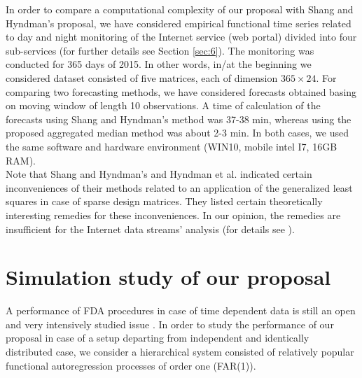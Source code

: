 \documentclass[12pt,a4paper]{article}
\numberwithin{equation}{section}
\begin{document}
In order to compare a computational complexity of our proposal with Shang and Hyndman's proposal, we have considered empirical functional time series related to day and night monitoring of the Internet service (web portal) divided into four sub-services (for further details see Section \ref{sec:6}). The monitoring was conducted for 365 days of 2015. In other words, in/at the beginning we considered dataset consisted of five matrices, each of dimension $365\times 24$. For comparing two forecasting methods, we have considered forecasts obtained basing on moving window of length 10 observations.
A time of calculation of the forecasts using Shang and Hyndman's method was 37-38 min, whereas using the proposed aggregated median method was about 2-3 min. In both cases, we used the same software and hardware environment (WIN10,
mobile intel I7, 16GB RAM).%
\\ Note that Shang and Hyndman's \cite{Shang} and Hyndman et al. \cite{Hyndman2011} indicated certain inconveniences of their methods related to an application of the generalized least squares in case of sparse design matrices. They listed certain theoretically interesting remedies for these inconveniences. In our opinion, the remedies are insufficient for the Internet data streams' analysis (for details see \cite{Kos2016}).
\section{Simulation study of our proposal}
A performance of FDA procedures in case of time dependent data is still an open and very intensively studied issue \cite{Hormann,Rana}.
In order to study the performance of our proposal in case of a setup departing from independent and identically distributed  case, we consider a hierarchical system consisted of relatively popular functional autoregression processes of order one (FAR(1)). 
\end{document}
